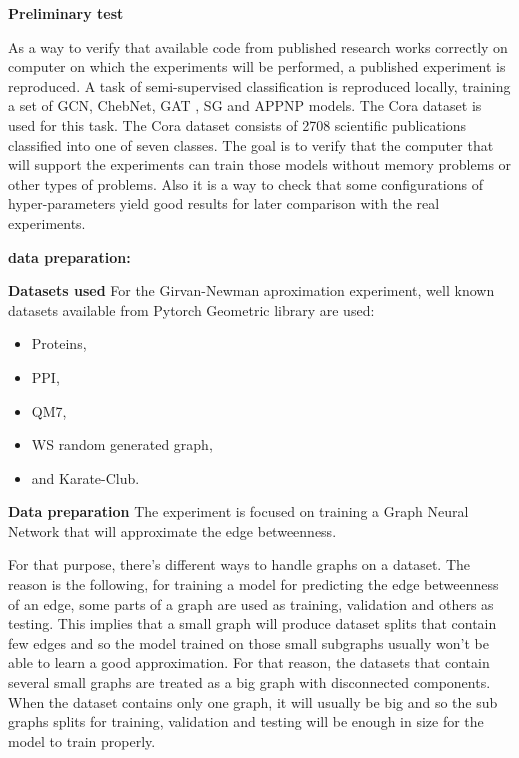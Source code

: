 \textbf{Preliminary test}

As a way to verify that available code from published research works correctly on computer on which the experiments will be performed, a published experiment is reproduced. A task of semi-supervised classification is reproduced locally, training a set of GCN, ChebNet, GAT , SG and APPNP models. The Cora dataset is used for this task.  The Cora dataset consists of 2708 scientific publications classified into one of seven classes. The goal is to verify that the computer that will support the experiments can train those models without memory problems or other types of problems. Also it is a way to check that some configurations of hyper-parameters yield good results for later comparison with the real experiments. 


\textbf{data preparation:}


\textbf{Datasets used}
For the Girvan-Newman aproximation experiment, well known datasets available from Pytorch Geometric library are used:
\begin{itemize}
	\item Proteins,
	\item PPI,
	\item QM7,
	\item WS random generated graph,
	\item and Karate-Club.
\end{itemize}

\textbf{Data preparation}
The experiment is focused on training a Graph Neural Network that will approximate the edge betweenness. 

For that purpose, there's different ways to handle graphs on a dataset. The reason is the following, for training  a model for predicting the edge betweenness of an edge, some parts of a graph are used as training, validation and others as testing. This implies that a small graph will produce dataset splits that contain few edges and so the model trained on those small subgraphs usually won't be able to learn a good approximation. For that reason, the datasets that contain  several small graphs are treated as a big graph with disconnected components. When the dataset contains only one graph, it will usually be big and so the sub graphs splits for training, validation and testing will be enough in size for the model to train properly.

